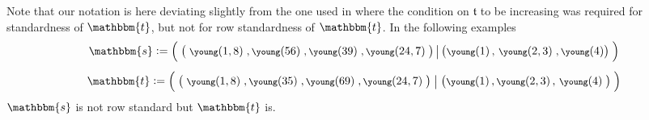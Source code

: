 \documentclass[10pt,a4,twoside,hidelinks,rm]{article}
\newcommand\es{\mathbbm{s}}
\newcommand\et{\mathbbm{t}}
\newcommand{\bT}{\pmb{\mathfrak{t}}}
\theoremstyle{plain}
\newtheorem{exa}[teo]{Example}
\begin{document}
Note that our notation is here deviating slightly from the one used in \cite{ER}
where the condition on $\bT $ to be increasing was required for standardness of $\et $, but not for
row standardness of $\et $.
In the following examples 
\begin{equation}\begin{array}{c}
\es :={\footnotesize\left(\;\left(\;\young(1,8)\;,\young(56)\;,\young(39)\;,\young(24,7)\;\right) \big|
  \left(  \young(1) \, , \, \young(2,3)\; ,\young(4) \right)\;\right)}
\\[4mm]
     \et :={\footnotesize\left(\;\left(\;\young(1,8)\;,\young(35)\;,\young(69)\;,\young(24,7)\;\right)  \bigm|
\left(  \young(1) \, , \young(2,3) \, , \,\young(4)\;\right)\;\right)}
\end{array}\end{equation}
$ \es $ is not row standard but $ \et $ is.







\end{document}
